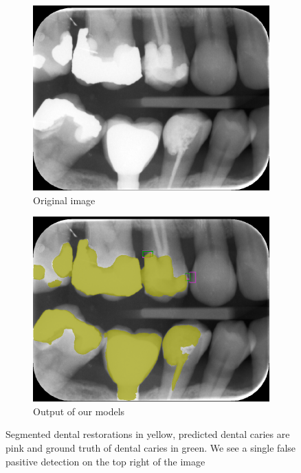 \begin{figure}[h]
    \centering
    \begin{subfigure}[b]{0.9\textwidth}
        \includegraphics[width=1\linewidth]{images/det2orig.png}
        \caption{Original image}
    \end{subfigure}

    \begin{subfigure}[b]{0.9\textwidth}
        \includegraphics[width=1\linewidth]{images/det2pred.png}
        \caption{Output of our models}
    \end{subfigure}
    \caption{ Segmented dental restorations in yellow, predicted dental caries are pink and ground truth of dental caries in green. We see a single false pasitive detection on the top right of the image}
    \label{}
\end{figure}

